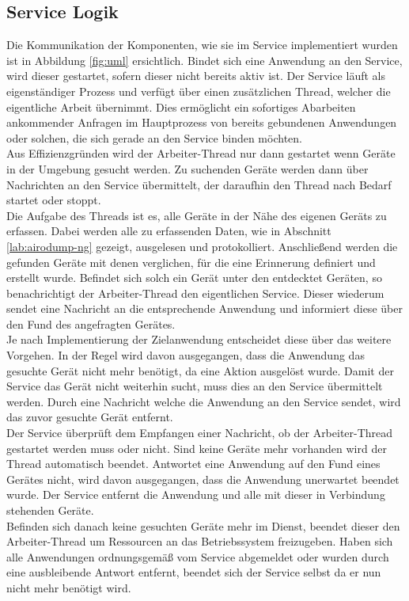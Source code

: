 \documentclass[]{report}
\begin{document}
\subsection{Service Logik}
Die Kommunikation der Komponenten, wie sie im Service implementiert wurden ist in Abbildung \ref{fig:uml} ersichtlich. Bindet sich eine Anwendung an den Service, wird dieser gestartet, sofern dieser nicht bereits aktiv ist. Der Service läuft als eigenständiger Prozess und verfügt über einen zusätzlichen Thread, welcher die eigentliche Arbeit übernimmt. Dies ermöglicht ein sofortiges Abarbeiten ankommender Anfragen im Hauptprozess von bereits gebundenen Anwendungen oder solchen, die sich gerade an den Service binden möchten. \\
Aus Effizienzgründen wird der Arbeiter-Thread nur dann gestartet wenn Geräte in der Umgebung gesucht werden. Zu suchenden Geräte werden dann über Nachrichten an den Service übermittelt, der daraufhin den Thread nach Bedarf startet oder stoppt. \\
Die Aufgabe des Threads ist es, alle Geräte in der Nähe des eigenen Geräts zu erfassen. Dabei werden alle zu erfassenden Daten, wie in Abschnitt \ref{lab:airodump-ng} gezeigt, ausgelesen und protokolliert. Anschließend werden die gefunden Geräte mit denen verglichen, für die eine Erinnerung definiert und erstellt wurde. Befindet sich solch ein Gerät unter den entdecktet Geräten, so benachrichtigt der Arbeiter-Thread den eigentlichen Service. Dieser wiederum sendet eine Nachricht an die entsprechende Anwendung und informiert diese über den Fund des angefragten Gerätes. \\ 
Je nach Implementierung der Zielanwendung entscheidet diese über das weitere Vorgehen. In der Regel wird davon ausgegangen, dass die Anwendung das gesuchte Gerät nicht mehr benötigt, da eine Aktion ausgelöst wurde. Damit der Service das Gerät nicht weiterhin sucht, muss dies an den Service übermittelt werden.  
Durch eine Nachricht welche die Anwendung an den Service sendet, wird das zuvor gesuchte Gerät entfernt.\\
Der Service überprüft dem Empfangen einer Nachricht, ob der Arbeiter-Thread gestartet werden muss oder nicht. Sind keine Geräte mehr vorhanden wird der Thread automatisch beendet. Antwortet eine Anwendung auf den Fund eines Gerätes nicht, wird davon ausgegangen, dass die Anwendung unerwartet beendet wurde. Der Service entfernt die Anwendung und alle mit dieser in Verbindung stehenden Geräte.\\
Befinden sich danach keine gesuchten Geräte mehr im Dienst, beendet dieser den Arbeiter-Thread um Ressourcen an das Betriebssystem freizugeben. Haben sich alle Anwendungen ordnungsgemäß vom Service abgemeldet oder wurden durch eine ausbleibende Antwort entfernt, beendet sich der Service selbst da er nun nicht mehr benötigt wird.
\end{document}
